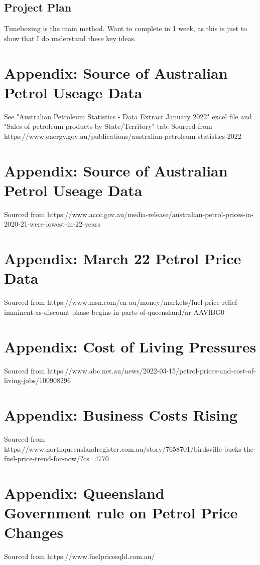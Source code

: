 \documentclass[10pt]{article} %
\begin{document}
\subsection{Project Plan}
Timeboxing is the main method. Want to complete in 1 week, as this is just to show that I do understand these key ideas.

\appendix

\section{Appendix: Source of Australian Petrol Useage Data}
\label{appendix:petrolUsePerMonth}
See "Australian Petroleum Statistics - Data Extract January 2022" excel file  and "Sales of petroleum products by State/Territory" tab. Sourced from https://www.energy.gov.au/publications/australian-petroleum-statistics-2022

\section{Appendix: Source of Australian Petrol Useage Data}
\label{appendix:petrolPricePerMonth}
Sourced from https://www.accc.gov.au/media-release/australian-petrol-prices-in-2020-21-were-lowest-in-22-years

\section{Appendix: March 22 Petrol Price Data}
\label{appendix:MarchPetrolPricePerMonth}
Sourced from https://www.msn.com/en-au/money/markets/fuel-price-relief-imminent-as-discount-phase-begins-in-parts-of-queensland/ar-AAVlBG0

\section{Appendix: Cost of Living Pressures}
\label{appendix:CostOfLiving}
Sourced from https://www.abc.net.au/news/2022-03-15/petrol-prices-and-cost-of-living-jobs/100908296

\section{Appendix: Business Costs Rising}
\label{appendix:TruckingIndustry}
Sourced from https://www.northqueenslandregister.com.au/story/7658701/birdsville-bucks-the-fuel-price-trend-for-now/?cs=4770

\section{Appendix: Queensland Government rule on Petrol Price Changes}
\label{appendix:QldGovPetrolPriceChangeRule}
Sourced from https://www.fuelpricesqld.com.au/
\end{document}
